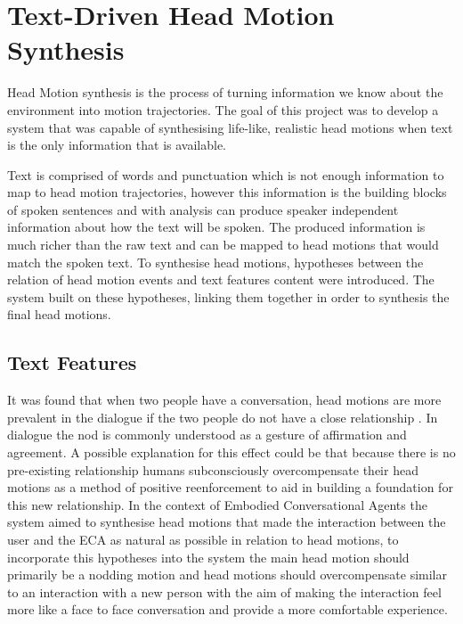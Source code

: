 \documentclass[bsc,frontabs,twoside,singlespacing,parskip,deptreport]{infthesis}
\begin{document}

\chapter{Text-Driven Head Motion Synthesis}

Head Motion synthesis is the process of turning information we know about the environment into motion trajectories. The goal of this project was to develop a system that was capable of synthesising life-like, realistic head motions when text is the only information that is available.

Text is comprised of words and punctuation which is not enough information to map to head motion trajectories, however this information is the building blocks of spoken sentences and with analysis can produce speaker independent information about how the text will be spoken. The produced information is much richer than the raw text and can be mapped  to head motions that would match the spoken text. To synthesise head motions, hypotheses between the relation of head motion events and text features content were introduced. The system built on these hypotheses, linking them together in order to synthesis the final head motions. 

\section{Text Features}

It was  found that when two people have a conversation, head motions are more prevalent in the dialogue if the two people do not have a close relationship \cite{first_paper}. In dialogue the nod is commonly understood as a gesture of affirmation and agreement. A possible explanation for this effect could be that because there is no pre-existing relationship humans subconsciously overcompensate their head motions as a method of positive reenforcement to aid in building a foundation for this new relationship. In the context of Embodied Conversational Agents the system aimed to synthesise head motions that made the interaction between the user and the ECA as natural as possible in relation to head motions, to incorporate this hypotheses into the system the main head motion should primarily be a nodding motion and head motions should overcompensate similar to an interaction with a new person with the aim of making the interaction feel more like a face to face conversation and provide a  more comfortable experience.
\end{document}

